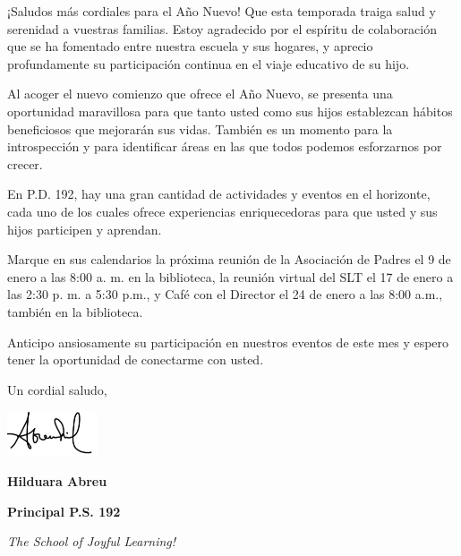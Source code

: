 \documentclass[12pt,letterpaper]{article}
\begin{document}
¡Saludos más cordiales para el Año Nuevo! Que esta temporada traiga salud y serenidad a vuestras familias. Estoy agradecido por el espíritu de colaboración que se ha fomentado entre nuestra escuela y sus hogares, y aprecio profundamente su participación continua en el viaje educativo de su hijo.

Al acoger el nuevo comienzo que ofrece el Año Nuevo, se presenta una oportunidad maravillosa para que tanto usted como sus hijos establezcan hábitos beneficiosos que mejorarán sus vidas. También es un momento para la introspección y para identificar áreas en las que todos podemos esforzarnos por crecer.

En P.D. 192, hay una gran cantidad de actividades y eventos en el horizonte, cada uno de los cuales ofrece experiencias enriquecedoras para que usted y sus hijos participen y aprendan.

Marque en sus calendarios la próxima reunión de la Asociación de Padres el 9 de enero a las 8:00 a. m. en la biblioteca, la reunión virtual del SLT el 17 de enero a las 2:30 p. m. a 5:30 p.m., y Café con el Director el 24 de enero a las 8:00 a.m., también en la biblioteca.

Anticipo ansiosamente su participación en nuestros eventos de este mes y espero tener la oportunidad de conectarme con usted.

Un cordial saludo,

\includegraphics[width=0.2\textwidth]{hil_signature}

\textbf{Hilduara Abreu}

\textbf{Principal P.S. 192}

\textit{The School of Joyful Learning!}
\end{document}
